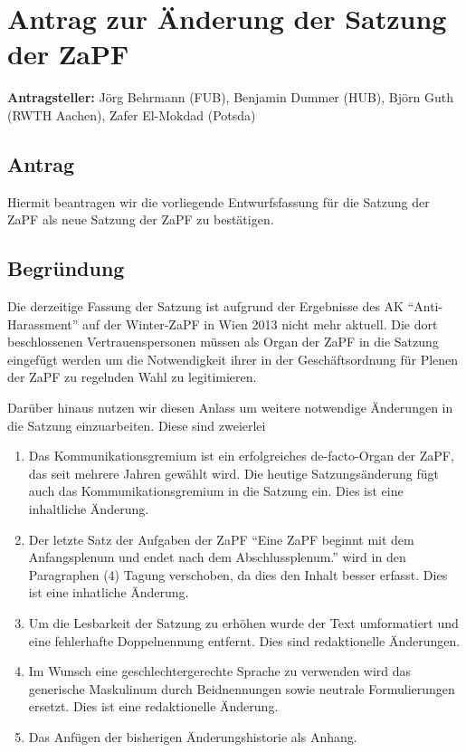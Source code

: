 \documentclass[draft,12pt,oneside]{scrartcl}
\begin{document}
\section*{Antrag zur Änderung der Satzung der ZaPF}

\textbf{Antragsteller:} Jörg Behrmann (FUB), Benjamin Dummer (HUB), Björn Guth (RWTH Aachen), Zafer El-Mokdad (Potsda)

\subsection*{Antrag}

Hiermit beantragen wir die vorliegende Entwurfsfassung für die Satzung der ZaPF als neue Satzung der ZaPF zu bestätigen.

\subsection*{Begründung}

Die derzeitige Fassung der Satzung ist aufgrund der Ergebnisse des AK ``Anti-Harassment'' auf der Winter-ZaPF in Wien
2013 nicht mehr aktuell. Die dort beschlossenen Vertrauenspersonen müssen als Organ der ZaPF in die Satzung eingefügt
werden um die Notwendigkeit ihrer in der Geschäftsordnung für Plenen der ZaPF zu regelnden Wahl zu legitimieren.

Darüber hinaus nutzen wir diesen Anlass um weitere notwendige Änderungen in die Satzung einzuarbeiten. Diese sind
zweierlei
\begin{enumerate}
\item Das Kommunikationsgremium ist ein erfolgreiches de-facto-Organ der ZaPF, das seit mehrere Jahren gewählt wird.
      Die heutige Satzungsänderung fügt auch das Kommunikationsgremium in die Satzung ein. Dies ist eine inhaltliche
      Änderung.
\item Der letzte Satz der Aufgaben der ZaPF ``Eine ZaPF beginnt mit dem Anfangsplenum und endet nach dem Abschlussplenum.''
      wird in den Paragraphen (4) Tagung verschoben, da dies den Inhalt besser erfasst. Dies ist eine inhatliche Änderung.
\item Um die Lesbarkeit der Satzung zu erhöhen wurde der Text umformatiert und eine fehlerhafte Doppelnennung entfernt.
      Dies sind redaktionelle Änderungen.
\item Im Wunsch eine geschlechtergerechte Sprache zu verwenden wird das generische Maskulinum durch Beidnennungen
      sowie neutrale Formulierungen ersetzt. Dies ist eine redaktionelle Änderung.
\item Das Anfügen der bisherigen Änderungshistorie als Anhang.
\end{enumerate}
\end{document}
